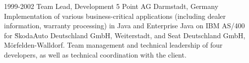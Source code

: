 \cventry
{1999-2002}
{Team Lead, Development}
{}
{5 Point AG}
{Darmstadt, Germany}
{
  Implementation of various business-critical applications (including dealer information,
  warranty processing) in Java and Enterprise Java on IBM AS/400 for \u SkodaAuto Deutschland GmbH, Weiterstadt,
  and Seat Deutschland GmbH, Mörfelden-Walldorf. Team management and technical leadership
  of four developers, as well as technical coordination with the client.
}
